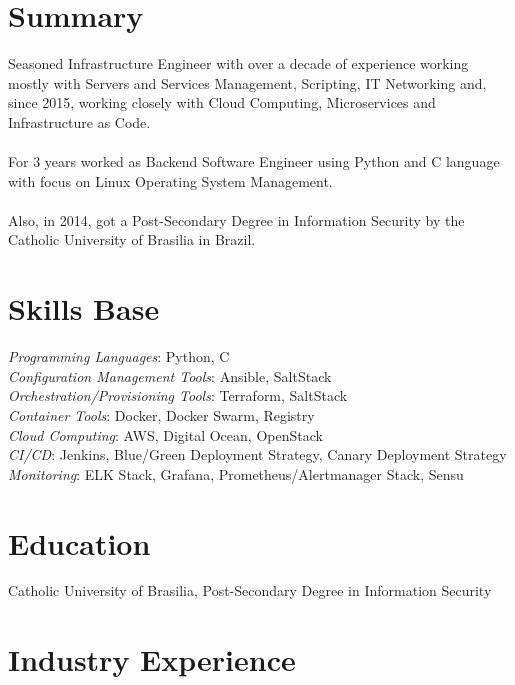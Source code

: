 \documentclass[margin]{res}
\begin{document}

\address{Winnipeg, MB, Canada \\
  \href{mailto:brunocriado@gmail.com}{brunocriado@gmail.com} \\ Phone: +1 431 588 3334}


\begin{resume}

  \section{Summary} Seasoned Infrastructure Engineer with over a decade of experience working mostly with Servers and Services
  Management, Scripting, IT Networking and, since 2015, working closely with Cloud Computing, Microservices and Infrastructure as Code.\\ \\
  For 3 years worked as Backend Software Engineer using Python and C language with focus on Linux Operating System Management.\\ \\
  Also, in 2014, got a Post-Secondary Degree in Information Security by the Catholic University of Brasilia in Brazil.

  \section{Skills Base}
  \textit{Programming Languages}: Python, C\\
  \textit{Configuration Management Tools}: Ansible, SaltStack\\
  \textit{Orchestration/Provisioning Tools}: Terraform, SaltStack\\
  \textit{Container Tools}: Docker, Docker Swarm, Registry\\
  \textit{Cloud Computing}: AWS, Digital Ocean, OpenStack\\
  \textit{CI/CD}: Jenkins, Blue/Green Deployment Strategy, Canary Deployment Strategy\\
  \textit{Monitoring}: ELK Stack, Grafana, Prometheus/Alertmanager Stack, Sensu

  \section{Education} Catholic University of Brasilia, Post-Secondary Degree in Information
  Security

  \section{Industry Experience}


\end{resume}
\end{document}
